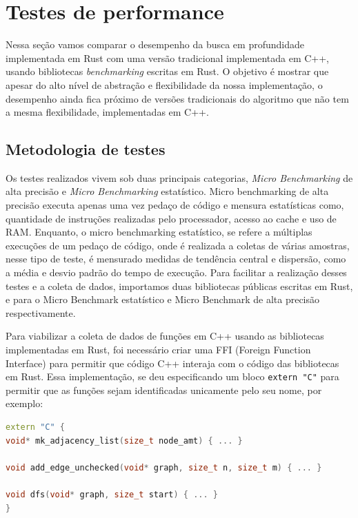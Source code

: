 \chapter{Testes de performance}
\label{ch:performance}

Nessa seção vamos comparar o desempenho da busca em profundidade implementada
em Rust com uma versão tradicional implementada em C++, usando
bibliotecas \textit{benchmarking} escritas em Rust. O
objetivo é mostrar que apesar do alto nível de abstração e
flexibilidade da nossa implementação, o desempenho ainda fica próximo
de versões tradicionais do algoritmo que não tem a mesma
flexibilidade, implementadas em C++.

\section{Metodologia de testes}

Os testes realizados vivem sob duas principais categorias,
\textit{Micro Benchmarking} de alta precisão e \textit{Micro
Benchmarking} estatístico. Micro
benchmarking de alta precisão executa apenas uma vez pedaço de código
e mensura estatísticas como, quantidade de
instruções realizadas pelo processador, acesso ao cache e uso de RAM.
Enquanto, o micro benchmarking estatístico, se refere a múltiplas
execuções de um pedaço de código, onde é realizada a coletas de várias
amostras, nesse tipo de teste, é mensurado medidas de tendência
central e dispersão, como a média e desvio padrão do tempo de execução.
Para facilitar a realização desses testes e a coleta de dados, importamos duas
bibliotecas públicas escritas em Rust, \cite{criterionrust} e
\cite{gungraunrust} para o Micro Benchmark estatístico e Micro
Benchmark de alta precisão respectivamente.

Para viabilizar a coleta de dados de funções em C++ usando as
bibliotecas implementadas em Rust, foi necessário criar uma FFI
(Foreign Function Interface) para permitir que código C++ interaja
com o código das bibliotecas em Rust. Essa implementação, se deu
especificando um bloco \texttt{extern "C"} para permitir que as
funções sejam identificadas unicamente pelo seu nome, por exemplo:

\begin{lstlisting}[language=C++, caption={Exemplo de interface FFI escrita em C++}, label=list:externCFfi]
extern "C" {
void* mk_adjacency_list(size_t node_amt) { ... }

void add_edge_unchecked(void* graph, size_t n, size_t m) { ... }

void dfs(void* graph, size_t start) { ... }
}
\end{lstlisting}

